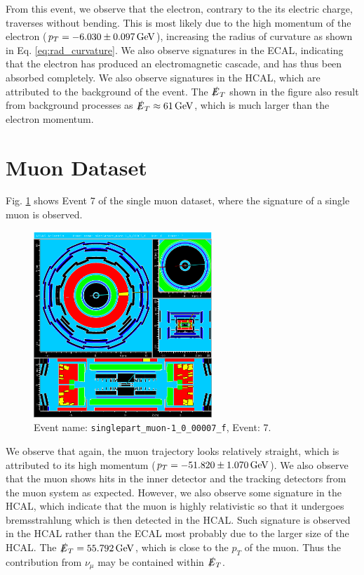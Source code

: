 \documentclass[a4paper]{report}
\numberwithin{equation}{section}
\begin{document}
From this event, we observe that the electron, contrary to the its electric charge, traverses without bending. This is most likely
due to the high momentum of the electron ($p_T = \SI{-6.03 \pm 0.097}{\giga\electronvolt}$), increasing the radius of curvature as shown in Eq. \ref{eq:rad_curvature}. We also observe 
signatures in the ECAL, indicating that the electron has produced an electromagnetic cascade, and has thus been absorbed completely. 
We also observe signatures in the HCAL, which are attributed to the background of the event. The $\slashed{E}_T$ shown in the 
figure also result from background processes as $\slashed{E}_T \approx \SI{61}{\giga\electronvolt}$, which is much larger than the 
electron momentum. \par 

\section{Muon Dataset}

Fig. \ref{fig:single_muon} shows Event 7 of the single muon dataset, where the signature of a single muon is observed. 

\begin{figure}[htpb]
    \centering
    \includegraphics[width=0.6\textwidth]{muon_event7.eps}
    \caption{Event name: \texttt{singlepart\_muon-1\_0\_00007\_f}, Event: 7. }
    \label{fig:single_muon}
\end{figure}

We observe that again, the muon trajectory looks relatively straight, which is attributed to its high momentum ($p_T = \SI{-51.82 \pm 1.070}{\giga\electronvolt}$).
We also observe that the muon shows hits in the inner detector and the tracking detectors from the muon system as expected. 
However, we also observe some signature in the HCAL, which indicate that the muon is highly relativistic so that it 
undergoes bremsstrahlung which is then detected in the HCAL. Such signature is observed in the HCAL rather than the ECAL most probably
due to the larger size of the HCAL. The $\slashed{E}_T = \SI{55.792}{\giga\electronvolt}$, which is close to the $p_T$ of the muon.
Thus the contribution from $\nu_\mu$ may be contained within $\slashed{E}_T$.
\end{document}
